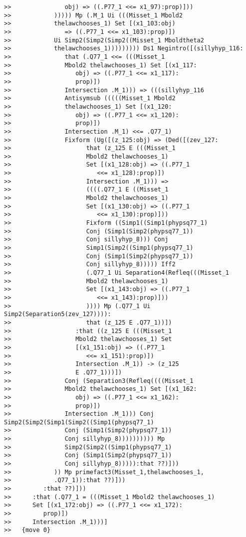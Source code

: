 \documentclass[12pt]{article}
\begin{document}
\begin{verbatim}
>>               obj) => ((.P77_1 <<= x1_97):prop)]))
>>            ))))) Mp (.M_1 Ui (((Misset_1 Mbold2
>>            thelawchooses_1) Set [(x1_103:obj)
>>               => ((.P77_1 <<= x1_103):prop)])
>>            Ui Simp2(Simp2(Simp2((Misset_1 Mboldtheta2
>>            thelawchooses_1))))))))) Ds1 Negintro([(sillyhyp_116:
>>               that (.Q77_1 <<= (((Misset_1
>>               Mbold2 thelawchooses_1) Set [(x1_117:
>>                  obj) => ((.P77_1 <<= x1_117):
>>                  prop)])
>>               Intersection .M_1))) => (((sillyhyp_116
>>               Antisymsub (((((Misset_1 Mbold2
>>               thelawchooses_1) Set [(x1_120:
>>                  obj) => ((.P77_1 <<= x1_120):
>>                  prop)])
>>               Intersection .M_1) <<= .Q77_1)
>>               Fixform (Ug([(z_125:obj) => (Ded([(zev_127:
>>                     that (z_125 E (((Misset_1
>>                     Mbold2 thelawchooses_1)
>>                     Set [(x1_128:obj) => ((.P77_1
>>                        <<= x1_128):prop)])
>>                     Intersection .M_1))) =>
>>                     ((((.Q77_1 E ((Misset_1
>>                     Mbold2 thelawchooses_1)
>>                     Set [(x1_130:obj) => ((.P77_1
>>                        <<= x1_130):prop)]))
>>                     Fixform ((Simp1((Simp1(phypsq77_1)
>>                     Conj (Simp1(Simp2(phypsq77_1))
>>                     Conj sillyhyp_8))) Conj
>>                     Simp1(Simp2((Simp1(phypsq77_1)
>>                     Conj (Simp1(Simp2(phypsq77_1))
>>                     Conj sillyhyp_8))))) Iff2
>>                     (.Q77_1 Ui Separation4(Refleq(((Misset_1
>>                     Mbold2 thelawchooses_1)
>>                     Set [(x1_143:obj) => ((.P77_1
>>                        <<= x1_143):prop)]))
>>                     )))) Mp (.Q77_1 Ui Simp2(Separation5(zev_127)))):
>>                     that (z_125 E .Q77_1))])
>>                  :that ((z_125 E (((Misset_1
>>                  Mbold2 thelawchooses_1) Set
>>                  [(x1_151:obj) => ((.P77_1
>>                     <<= x1_151):prop)])
>>                  Intersection .M_1)) -> (z_125
>>                  E .Q77_1)))])
>>               Conj (Separation3(Refleq((((Misset_1
>>               Mbold2 thelawchooses_1) Set [(x1_162:
>>                  obj) => ((.P77_1 <<= x1_162):
>>                  prop)])
>>               Intersection .M_1))) Conj Simp2(Simp2(Simp1(Simp2((Simp1(phypsq77_1)
>>               Conj (Simp1(Simp2(phypsq77_1))
>>               Conj sillyhyp_8)))))))))) Mp
>>               Simp2(Simp2((Simp1(phypsq77_1)
>>               Conj (Simp1(Simp2(phypsq77_1))
>>               Conj sillyhyp_8))))):that ??)]))
>>            )) Mp primefact3(Misset_1,thelawchooses_1,
>>            .Q77_1)):that ??)]))
>>         :that ??)]))
>>      :that (.Q77_1 = (((Misset_1 Mbold2 thelawchooses_1)
>>      Set [(x1_172:obj) => ((.P77_1 <<= x1_172):
>>         prop)])
>>      Intersection .M_1)))]
>>   {move 0}



\end{verbatim}
\end{document}
